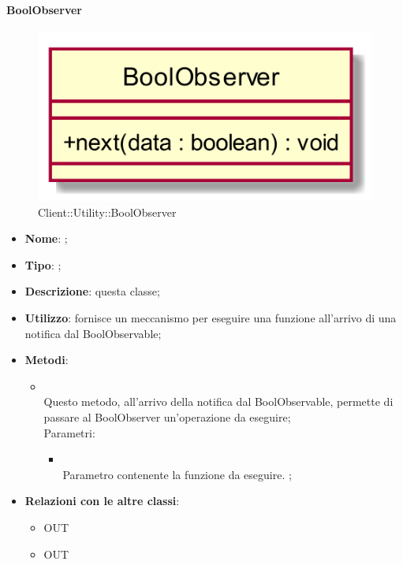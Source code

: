 \hypertarget{BoolObserver_label}{\paragraph{BoolObserver}}
\begin{figure}[h]
	\centering
	\includegraphics[width=\textwidth,height=\textheight,keepaspectratio]{images/ClassBoolObserver.png}
	\caption{Client::Utility::BoolObserver}
\end{figure}
\begin{itemize}
	\item \textbf{Nome}: ;
	\item \textbf{Tipo}: ;
	\item \textbf{Descrizione}: questa classe;
	\item \textbf{Utilizzo}: fornisce un meccanismo per eseguire una funzione all'arrivo di una notifica dal BoolObservable;
	\item \textbf{Metodi}:
	\begin{itemize}
		\item[]  \\
		Questo metodo, all'arrivo della notifica dal BoolObservable, permette di passare al BoolObserver un'operazione da eseguire;\\
		Parametri:
		\begin{itemize}
			\item {} \\
			Parametro contenente la funzione da eseguire.
;
		\end{itemize}
	\end{itemize}
	\item \textbf{Relazioni con le altre classi}:
	\begin{itemize}
		\item OUT \hyperlink{Recorder_label}{}
		\item OUT \hyperlink{BoolObservable_label}{}
	\end{itemize}
\end{itemize}

